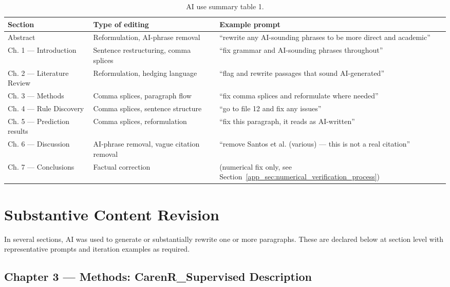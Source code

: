 \begin{table}[htbp]
  \centering
  \caption{AI use summary table 1.}\label{tab:appe_1}
  \footnotesize
  \begin{adjustbox}{max width=\textwidth}
    \begin{tabularx}{\textwidth}{p{3.2cm}|p{4.0cm}|X}
  \toprule
  Section & Type of editing & Example prompt \\
  \midrule
  Abstract & Reformulation, AI-phrase removal & ``rewrite any AI-sounding phrases to be more direct and academic'' \\
  Ch. 1 --- Introduction & Sentence restructuring, comma splices & ``fix grammar and AI-sounding phrases throughout'' \\
  Ch. 2 --- Literature Review & Reformulation, hedging language & ``flag and rewrite passages that sound AI-generated'' \\
  Ch. 3 --- Methods & Comma splices, paragraph flow & ``fix comma splices and reformulate where needed'' \\
  Ch. 4 --- Rule Discovery & Comma splices, sentence structure & ``go to file 12 and fix any issues'' \\
  Ch. 5 --- Prediction results & Comma splices, reformulation & ``fix this paragraph, it reads as AI-written'' \\
  Ch. 6 --- Discussion & AI-phrase removal, vague citation removal & ``remove Santos et al. (various) --- this is not a real citation'' \\
  Ch. 7 --- Conclusions & Factual correction & (numerical fix only, see Section~\ref{app_sec:numerical_verification_process}) \\
  \bottomrule
\end{tabularx}
  \end{adjustbox}

\end{table}


\section{Substantive Content Revision}\label{app_sec:substantive_content_revision}

In several sections, AI was used to generate or substantially rewrite one or more paragraphs. These are declared below at section level with representative prompts and iteration examples as required.


\subsection{Chapter 3 --- Methods: CarenR\_Supervised Description}\label{app_sub:chapter_3_methods_carenrsupervised}

